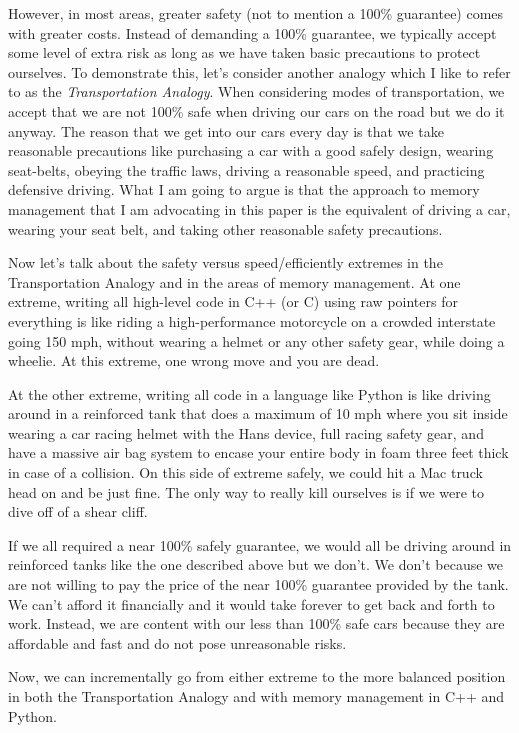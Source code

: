 \documentclass[pdf,ps2pdf,11pt]{SANDreport}
\begin{document}
However, in most areas, greater safety (not to mention a 100\%
guarantee) comes with greater costs.  Instead of demanding a 100\%
guarantee, we typically accept some level of extra risk as long as we
have taken basic precautions to protect ourselves.  To demonstrate
this, let's consider another analogy which I like to refer to as the
{}\textit{Transportation Analogy}.  When considering modes of
transportation, we accept that we are not 100\% safe when driving our
cars on the road but we do it anyway.  The reason that we get into our
cars every day is that we take reasonable precautions like purchasing
a car with a good safely design, wearing seat-belts, obeying the
traffic laws, driving a reasonable speed, and practicing defensive
driving.  What I am going to argue is that the approach to memory
management that I am advocating in this paper is the equivalent of
driving a car, wearing your seat belt, and taking other reasonable
safety precautions.

Now let's talk about the safety versus speed/efficiently extremes in
the Transportation Analogy and in the areas of memory management.  At
one extreme, writing all high-level code in C++ (or C) using raw
pointers for everything is like riding a high-performance motorcycle
on a crowded interstate going 150 mph, without wearing a helmet or
any other safety gear, while doing a wheelie.  At this extreme, one
wrong move and you are dead.

At the other extreme, writing all code in a language like Python is
like driving around in a reinforced tank that does a maximum of 10
mph where you sit inside wearing a car racing helmet with the Hans
device, full racing safety gear, and have a massive air bag system to
encase your entire body in foam three feet thick in case of a
collision.  On this side of extreme safely, we could hit a Mac truck
head on and be just fine.  The only way to really kill ourselves is if
we were to dive off of a shear cliff.

If we all required a near 100\% safely guarantee, we would all be
driving around in reinforced tanks like the one described above but we
don't.  We don't because we are not willing to pay the price of the
near 100\% guarantee provided by the tank.  We can't afford it
financially and it would take forever to get back and forth to
work. Instead, we are content with our less than 100\% safe cars
because they are affordable and fast and do not pose unreasonable
risks.

Now, we can incrementally go from either extreme to the more balanced
position in both the Transportation Analogy and with memory management
in C++ and Python.
\end{document}
